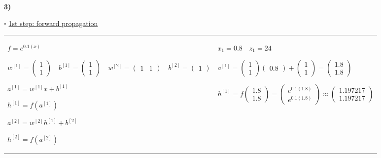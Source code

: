 \documentclass[11pt,a4paper]{article}
\newcommand\sbullet[1][.5]{\mathbin{\vcenter{\hbox{\scalebox{#1}{$\bullet$}}}}}
\begin{document}
\begin{flushleft}
\textbf{3)}
\par $\sbullet$ \underline{1st step: forward propagation} \par
\small
\begin{tabularx}{1.09\textwidth}{X X}
  $ f = e^{0.1(x)} $ \par \vspace{1mm}
  $ w^{[1]} = \begin{pmatrix} 1 \\ 1 \end{pmatrix} \quad b^{[1]} = \begin{pmatrix} 1 \\ 1 \end{pmatrix} \quad w^{[2]} = \begin{pmatrix} 1 & 1 \end{pmatrix} \quad b^{[2]} = \begin{pmatrix} 1 \end{pmatrix} $ \par \vspace{1mm}
  $ a^{[1]} = w^{[1]}x + b^{[1]} $ \par \vspace{1mm}
  $ h^{[1]} = f(a^{[1]}) $ \par \vspace{1mm}
  $ a^{[2]} = w^{[2]}h^{[1]} + b^{[2]} $ \par \vspace{1mm}
  $ h^{[2]} = f(a^{[2]}) $ \par \vspace{1mm}
  & %
  $ \boxed{x_1 = 0.8} \quad z_1 = 24 $ \par \vspace{1mm}
  $ a^{[1]} = \begin{pmatrix} 1 \\ 1 \end{pmatrix} \begin{pmatrix} 0.8 \end{pmatrix} + \begin{pmatrix} 1 \\ 1 \end{pmatrix} = \begin{pmatrix} 1.8 \\ 1.8 \end{pmatrix} $ \par \vspace{1mm}
  $ h^{[1]} = f \begin{pmatrix} 1.8 \\ 1.8 \end{pmatrix} = \begin{pmatrix} e^{0.1(1.8)} \\ e^{0.1(1.8)} \end{pmatrix} \approx \begin{pmatrix} 1.197217 \\ 1.197217 \end{pmatrix} $ \par \vspace{1mm}

\end{tabularx}
\end{flushleft}
\end{document}
